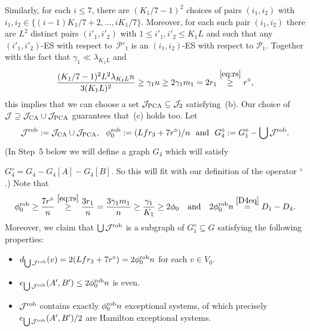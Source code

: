 \documentclass{memo-l}
\def\COMMENT#1{}
\def\cP{\mathcal{P}}
\def\cJ{\mathcal{J}}
\numberwithin{section}{chapter}
\numberwithin{equation}{section}
\numberwithin{firstthm}{section}
\numberwithin{figure}{section}
\begin{document}
{Similarly,  for each $i \le 7$, there are $(K_1/7-1)^2$ choices of pairs $(i_1,i_2)$ with $i_1,i_2\in \{(i-1)K_1/7+2,\dots,iK_1/7\}$.
Moreover, for each such pair $(i_1,i_2)$ there are $L^2$ distinct pairs $(i'_1,i'_2)$ with $1 \le i'_1,i'_2  \le K_1L$ and
such that any $(i'_1,i'_2)$-ES with respect to~$\cP'_1$ is an $(i_1,i_2)$-ES with respect to $\cP_1$.
Together with the fact that $\gamma_1 \ll \lambda_{K_1L}$ and
$$ \frac{(K_1/7-1)^2 L^2 \lambda_{K_1L} n }{3 (K_1 L)^2 }
\ge \gamma_1 n 
\ge 2 \gamma_1 m_1 = 2 r_1
\stackrel{\eqref{eq:rs}}{\ge} r^\diamond,$$
this implies that we can choose a set $\mathcal{J}_{\rm PCA}\subseteq \cJ_2$ satisfying~(b).
Our choice of $\cJ\supseteq \mathcal{J}_{\rm CA}\cup \mathcal{J}_{\rm PCA}$ guarantees that~(c) holds too.
Let 
\begin{equation} \label{robphieq}
\mathcal{J}^{\rm rob} := \mathcal{J}_{\rm CA} \cup \mathcal{J}_{\rm PCA}, \ \ 
\phi^{\rm rob}_0: = (Lfr_3 + 7 r^{\diamond})/n \ \ \mbox{and} \ \  G^{\diamond}_4 : = G_1^{\diamond} - \bigcup \mathcal{J}^{\rm rob}.
\end{equation}
(In Step~5 below we will define a graph $G_4$ which will satisfy%
    \COMMENT{Daniela: replaced $(G_4)^{\diamond}$ by $G_4^\diamond$}
$G_4^{\diamond} = G_4 - G_4[A] - G_4[B]$. So this
will fit with our definition of the operator $^\diamond$.)
Note that
\begin{equation}\label{eq:phi0rob}
\phi^{\rm rob}_0\ge \frac{7r^\diamond}{n}\stackrel{\eqref{eq:rs}}{\ge} \frac{3r_1}{n}=\frac{3\gamma_1m_1}{n}\ge \frac{\gamma_1}{K_1}\ge 2\phi_0
\ \ \ \text{and} \ \ \ 2 \phi^{\rm rob}_0 n \stackrel{\eqref{D4eq}}{=} D_1 - D_4.
\end{equation}
Moreover, we claim that $\bigcup \mathcal{J}^{\rm rob}$ is a subgraph of $G^\diamond_1\subseteq G$
satisfying the following properties:%
    \COMMENT{Daniela: replaced $D - (\phi_0  + 2 \phi^{\rm rob}_0n)/2$ by $(D - (\phi_0  + 2 \phi^{\rm rob}_0)n)/2$ in ($\beta_5$)}
\begin{itemize}
	\item[($\beta_1$)] $d_{\bigcup\mathcal{J}^{\rm rob}} (v) = 2(Lfr_3 + 7 r^{\diamond}) = 2 \phi^{\rm rob}_0 n $ for each $v \in V_0$. 
	\item[($\beta_2$)] $e_{\bigcup\mathcal{J}^{\rm rob}}(A',B')\le 2 \phi^{\rm rob}_0 n$ is even.
	\item[($\beta_3$)] $\mathcal{J}^{\rm rob}$ contains exactly $\phi^{\rm rob}_0 n$ exceptional systems, of which
precisely \\ $e_{\bigcup \mathcal{J}^{\rm rob}}(A',B')/2$ are Hamilton exceptional systems.

\end{itemize}}
\end{document}
